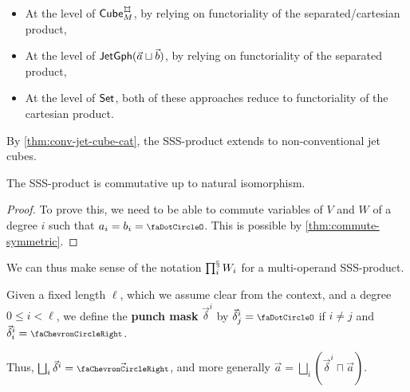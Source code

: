 \documentclass[a4paper]{memoir}
\begin{document}
\begin{definition}
\begin{itemize}
		\begin{itemize}
			\item At the level of $\cubecat_M^\mycubex$, by relying on functoriality of the separated/cartesian product,
			\item At the level of $\mathsf{JetGph}(\vec a \sqcup \vec b)$, by relying on functoriality of the separated product,
			\item At the level of ${\mathsf{Set}}$, both of these approaches reduce to functoriality of the cartesian product.
		\end{itemize}
	\end{itemize}
	By \cref{thm:conv-jet-cube-cat}, the SSS-product extends to non-conventional jet cubes.
\end{definition}
\begin{corollary} \label{thm:sssprod-commut}
	The SSS-product is commutative up to natural isomorphism.
\end{corollary}
\begin{proof}
	To prove this, we need to be able to commute variables of $V$ and $W$ of a degree $i$ such that $a_i = b_i = \npolar$.
	This is possible by \cref{thm:commute-symmetric}.
\end{proof}
We can thus make sense of the notation $\prod^{\mathbin{\mathsection}}_i W_i$ for a multi-operand SSS-product.
\begin{definition}
	Given a fixed length $\ell$, which we assume clear from the context, and a degree $0 \leq i < \ell$, we define the \textbf{punch mask} $\vec \delta^i$ by $\vec \delta^i_j = \npolar$ if $i \neq j$ and $\vec \delta^i_i = \ypolar$.
\end{definition}
Thus, $\bigsqcup_i \vec \delta^i = \vec{\ypolar}$, and more generally $\vec a = \bigsqcup_i (\vec \delta^i \sqcap \vec a)$.
\end{document}
